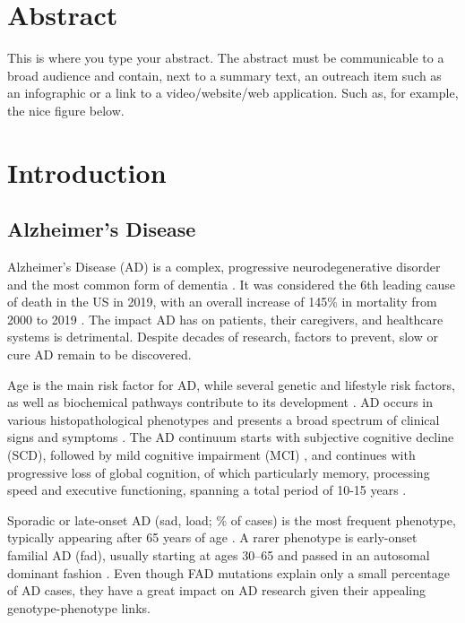 \documentclass{amsart}
\theoremstyle{plain}
\newcommand{\mainmatter}{
    \newpage
    \pagenumbering{arabic}  %
}
\begin{document}
\newpage
\section*{Abstract}
This is where you type your abstract.
The abstract must be communicable to a broad audience and contain, next to a summary text, an outreach item such as an infographic or a link to a video/website/web application.
Such as, for example, the nice figure below.


\clearpage
\printacronyms[title = Abbreviations, toctitle = Abbreviations]

\newpage
\tableofcontents

\mainmatter

\newpage
\section{Introduction}\label{Intro}
\subsection{Alzheimer’s Disease}
Alzheimer’s Disease (AD) is a complex, progressive neurodegenerative disorder and the most common form of dementia \cite{Penke2023NewDisease}. It was considered the 6th leading cause of death in the US in 2019, with an overall increase of 145\% in mortality from 2000 to 2019 \cite{20232023Figures}. The impact AD has on patients, their caregivers, and healthcare systems is detrimental. Despite decades of research, factors to prevent, slow or cure AD remain to be discovered.

Age is the main risk factor for AD, while several genetic and lifestyle risk factors, as well as biochemical pathways contribute to its development \cite{Penke2023NewDisease}. AD occurs in various histopathological phenotypes and presents a broad spectrum of clinical signs and symptoms \cite{Heneka2015NeuroinflammationDisease, Edwards2019ANeurodegeneration}. The AD continuum starts with subjective cognitive decline (SCD), followed by mild cognitive impairment (MCI) \cite{Rasmussen2019AlzheimersDiagnosis}, and continues with progressive loss of global cognition, of which particularly memory, processing speed and executive functioning, spanning a total period of 10-15 years \cite{Scheltens2016AlzheimersDisease}. 

Sporadic or late-onset AD (\acrshort{sad}, \acrshort{load}; \% of cases) is the most frequent phenotype, typically appearing after 65 years of age \cite{Beydoun2014EpidemiologicMeta-analysis}. A rarer phenotype is early-onset familial AD (\acrshort{fad}), usually starting at ages 30–65 and passed in an autosomal dominant fashion \cite{VanCauwenberghe2015ThePerspectives}.
Even though FAD mutations explain only a small percentage of AD cases, they have a great impact on AD research given their appealing genotype-phenotype links.
\end{document}
